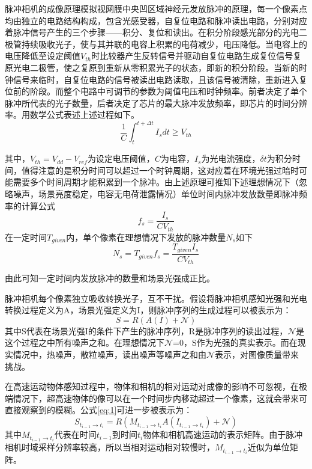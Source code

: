 脉冲相机的成像原理模拟视网膜中央凹区域神经元发放脉冲的原理，每一个像素点均由独立的电路结构构成，包含光感受器，自复位电路和脉冲读出电路，分别对应着脉冲信号产生的三个步骤——积分、复位和读出。在积分阶段感光部分的光电二极管持续吸收光子，使与其并联的电容上积累的电荷减少，电压降低。当电容上的电压降低至设定阈值$V_{th}$时比较器产生反转信号并驱动自复位电路生成复位信号复原光电二极管，使之复原到重新从零积累光子的状态，即新的积分阶段。当新的时钟信号来临时，自复位电路的信号被读出电路读取，且该信号被清除，重新进入复位前的阶段。而整个电路中可调节的参数为阈值电压和时钟频率。前者决定了单个脉冲所代表的光子数量，后者决定了芯片的最大脉冲发放频率，即芯片的时间分辨率。用数学公式表述上述过程如下。
\begin{equation}
  \label{eq:4}
  \frac{1}{C} \int_{t}^{t+\Delta t} I_s dt \geq V_{th}
\end{equation}

其中，$V_{th} = V_{dd} - V_{ref}$为设定电压阈值，$C$为电容，$I_s$为光电流强度，$\delta t$为积分时间，值得注意的是积分时间可以超过一个时钟周期，这对应着在环境光强过暗时可能需要多个时间周期才能积累到一个脉冲。由上述原理可推知下述理想情况下（忽略噪声，场景亮度稳定，电容无电荷泄露情况）单位时间内脉冲发放数量即脉冲频率的计算公式
\begin{equation}
  \label{eq:5}
  f_s = \frac{I_s}{CV_{th}}
\end{equation}
在一定时间$T_{given}$内，单个像素在理想情况下发放的脉冲数量$N_{s}$如下
\begin{equation}
  \label{eq:6}
  N_{s} = T_{given} f_s = \frac{T_{given} I_s}{CV_{th}}
\end{equation}

由此可知一定时间内发放脉冲的数量和场景光强成正比。


脉冲相机每个像素独立吸收转换光子，互不干扰。假设将脉冲相机感知光强和光电转换过程定义为A，场景光强定义为I，则脉冲序列的生成过程可以被表示为：
\begin{equation}
  \label{eq:1}
  S=R(A(I)+\mathcal{N})
\end{equation}
其中S代表在场景光强I的条件下产生的脉冲序列，R是脉冲序列的读出过程，$\mathcal{N}$是这个过程之中所有噪声之和。在理想情况下$\mathcal{N}$=0，S作为光强的真实表示。而在现实情况中，热噪声，散粒噪声，读出噪声等噪声之和由$\mathcal{N}$表示，对图像质量带来挑战。

在高速运动物体感知过程中，物体和相机的相对运动对成像的影响不可忽视，在极端情况下，超高速物体的像可以在一个时间步内移动超过一个像素，这就会带来可直接观察到的模糊。公式\ref{eq:1}可进一步被表示为：
\begin{equation}
  \label{eq:2}
  S_{t_{i-1} \rightarrow t_{i}}=R(M_{t_{i-1} \rightarrow t_{i}}A(I_{t_{i-1} \rightarrow t_{i}})+\mathcal{N})
\end{equation}
其中$M_{t_{i-1} \rightarrow t_{i}}$代表在时间$t_{i-1}$到时间$t_{i}$物体和相机高速运动的表示矩阵。由于脉冲相机时域采样分辨率较高，所以当相对运动相对较慢时，$M_{t_{i-1} \rightarrow t_{i}}$近似为单位矩阵。

